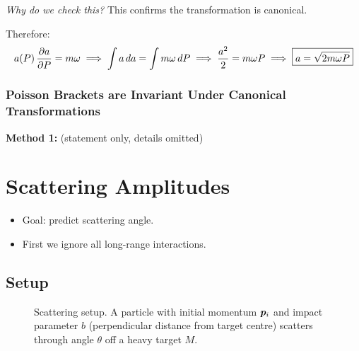 \textit{Why do we check this?} This confirms the transformation is canonical.

Therefore:
\[
    a(P)\,\pdv{a}{P} = m\omega
    \implies \int a\,da = \int m\omega\,dP
    \implies \frac{a^2}{2} = m\omega P
    \implies \boxed{a = \sqrt{2m\omega P}}
\]

\subsection{Poisson Brackets are Invariant Under Canonical Transformations}

\textbf{Method 1:} (statement only, details omitted)

\chapter{Scattering Amplitudes}


\begin{itemize}
    \item Goal: predict scattering angle.
    \item First we ignore all long-range interactions.
\end{itemize}

\section{Setup}

\begin{figure}[H]
\begin{center}
\end{center}
\caption{Scattering setup. A particle with initial momentum $\bm{p}_i$ and impact parameter $b$ (perpendicular distance from target centre) scatters through angle $\theta$ off a heavy target $M$.}
\label{fig:scattering_setup}
\end{figure}

